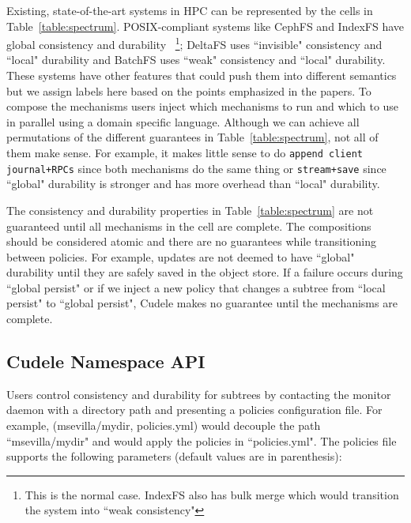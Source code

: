 Existing, state-of-the-art systems in HPC can be represented by the cells in
Table~\ref{table:spectrum}.  POSIX-compliant systems like CephFS and IndexFS
have global consistency and durability ~\footnote{This is the normal case.
IndexFS also has bulk merge which would transition the system into ``weak
consistency"}; DeltaFS uses ``invisible" consistency and ``local" durability
and BatchFS uses ``weak" consistency and ``local" durability. These systems
have other features that could push them into different semantics but we assign
labels here based on the points emphasized in the papers.  To compose the
mechanisms users inject which mechanisms to run and which to use in parallel
using a domain specific language.  Although we can achieve all permutations of
the different guarantees in Table~\ref{table:spectrum}, not all of them make
sense. For example, it makes little sense to do \texttt{append client journal+RPCs} since
both mechanisms do the same thing or \texttt{stream+save} since ``global"
durability is stronger and has more overhead than ``local" durability. 

The consistency and durability properties in Table~\ref{table:spectrum} are not
guaranteed until all mechanisms in the cell are complete. The compositions
should be considered atomic and there are no guarantees while transitioning
between policies. For example, updates are not deemed to have ``global" durability until
they are safely saved in the object store. If a failure occurs during ``global
persist" or if we inject a new policy that changes a subtree from ``local
persist" to ``global persist", Cudele makes no guarantee until the mechanisms are
complete.

\subsection{Cudele Namespace API}
\label{sec:cudelefs-namespace-api}



Users control consistency and durability for subtrees by contacting the monitor
daemon with a directory path and presenting a policies configuration file.
For example, (msevilla/mydir, policies.yml) would decouple the path
``msevilla/mydir" and would apply the policies in ``policies.yml".  The
policies file supports the following parameters (default values are in parenthesis):

